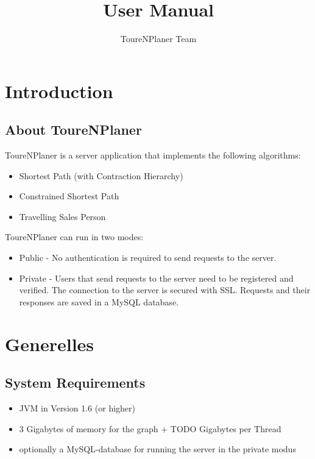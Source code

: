 \documentclass[ngerman,titlepage,parskip=true]{scrartcl}
\title{User Manual}
\author{ToureNPlaner Team}
\begin{document}
\maketitle

\tableofcontents

\pagebreak

\section{Introduction}

	\subsection{About ToureNPlaner}
   ToureNPlaner is a server application that implements the following algorithms:
   \begin{itemize}
     \item Shortest Path (with Contraction Hierarchy)
     \item Constrained Shortest Path
     \item Travelling Sales Person
   \end{itemize}
   ToureNPlaner can run in two modes:
   \begin{itemize}
     \item Public - No authentication is required to send requests to the server.
     \item Private - Users that send requests to the server need to be registered and verified. The connection to the server is secured with SSL. Requests and their responses are saved in a MySQL database.
   \end{itemize}


\section{Generelles}
	\subsection{System Requirements}
	
	\begin{itemize}
		\item JVM in Version 1.6 (or higher)
		\item 3 Gigabytes of memory for the graph + TODO Gigabytes per Thread
		\item optionally a MySQL-database for running the server in the private modus
	\end{itemize}
\end{document}
